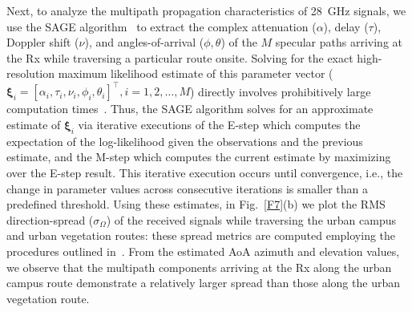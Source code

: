 \documentclass[12pt, draftcls, onecolumn]{IEEEtran}
\begin{document}
Next, to analyze the multipath propagation characteristics of \SI{28}{\giga\hertz} signals, we use the SAGE algorithm~\cite{SAGE} to extract the complex attenuation ($\alpha$), delay ($\tau$), Doppler shift ($\nu$), and angles-of-arrival ($\phi,\theta$) of the $M$ specular paths arriving at the Rx while traversing a particular route onsite. Solving for the exact high-resolution maximum likelihood estimate of this parameter vector ($\bm{\xi}_{i}{=}[\alpha_{i},\tau_{i},\nu_{i},\phi_{i},\theta_{i}]^{\intercal},i{=}1,2,{\dots},M$) directly involves prohibitively large computation times~\cite{SAGE}. Thus, the SAGE algorithm solves for an approximate estimate of $\bm{\xi}_{i}$ via iterative executions of the E-step which computes the expectation of the log-likelihood given the observations and the previous estimate, and the M-step which computes the current estimate by maximizing over the E-step result. This iterative execution occurs until convergence, i.e., the change in parameter values across consecutive iterations is smaller than a predefined threshold. Using these estimates, in Fig.~\ref{F7}(b) we plot the RMS direction-spread ($\sigma_{\Omega}$) of the received signals while traversing the urban campus and urban vegetation routes: these spread metrics are computed employing the procedures outlined in~\cite{Indoor60G}. From the estimated AoA azimuth and elevation values, we observe that the multipath components arriving at the Rx along the urban campus route demonstrate a relatively larger spread than those along the urban vegetation route.
\end{document}
